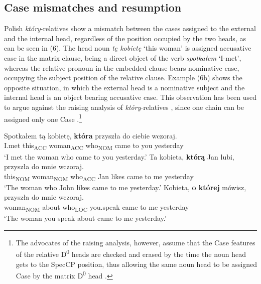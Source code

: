 \documentclass[output=paper]{langsci/langscibook}
\begin{document}
\subsection{Case mismatches and resumption}%

Polish \textit{który}{}-relatives show a mismatch between the cases assigned to the external and the internal head, regardless of the position occupied by the two heads, as can be seen in (6). The head noun \textit{tę kobietę} ‘this woman’ is assigned accusative case in the matrix clause, being a direct object of the verb \textit{spotkałem} ‘I-met’, whereas the relative pronoun in the embedded clause bears nominative case, occupying the subject position of the relative clause. Example (6b) shows the opposite situation, in which the external head is a nominative subject and the internal head is an object bearing accusative case. This observation has been used to argue against the raising analysis of \textit{który}{}-relatives \citep{Borsley1997}, since one chain can be assigned only one Case \citep{Chomsky1982}.\footnote{The advocates of the raising analysis, however, assume that the Case features of the relative D\textsuperscript{0} heads are checked and erased by the time the noun head gets to the SpecCP position, thus allowing the same noun head to be assigned Case by the matrix D\textsuperscript{0} head \citep{Kayne1994,Bianchi2000,Citko2004}.}

\ea%
    \label{ex:leska:6}
    \ea
    \gll Spotkałem   tą   kobietę,   \textbf{która}   przyszła  do  ciebie   wczoraj.        \\
          I.met   this\textsubscript{ACC}   woman\textsubscript{ACC}   who\textsubscript{NOM}   came   to  you  yesterday\\
    \glt ‘I met the woman who came to you yesterday.’
    \ex
    \gll Ta     kobieta,   \textbf{którą}   Jan  lubi,  przyszła  do  mnie  wczoraj.  \\
         this\textsubscript{NOM}   woman\textsubscript{NOM}   who\textsubscript{ACC}   Jan likes   came   to  me   yesterday\\
    \glt ‘The woman who John likes came to me yesterday.’
    \ex
    \gll Kobieta,   \textbf{o  której}   mówisz,   przyszła  do  mnie   wczoraj.\\
         woman\textsubscript{NOM}  about   who\textsubscript{LOC}   you.speak   came   to   me   yesterday\\
    \glt ‘The woman you speak about came to me yesterday.’
    \z
\z
\end{document}
